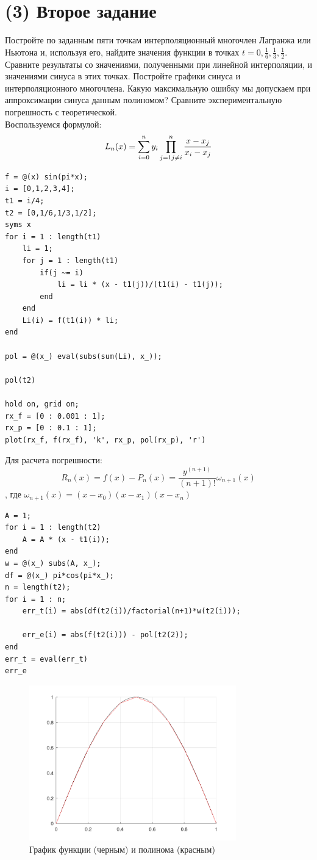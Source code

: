 \section{(3) Второе задание}
Постройте по заданным пяти точкам интерполяционный многочлен Лагранжа или Ньютона и, используя его, найдите значения функции в точках $t =0, \frac{1}{6}, \frac{1}{3}, \frac{1}{2}$. Сравните результаты со значениями, полученными при линейной интерполяции, и значениями синуса в этих точках. Постройте графики синуса и интерполяционного многочлена. Какую максимальную ошибку мы допускаем при аппроксимации синуса данным полиномом? Сравните экспериментальную погрешность с теоретической.\\[2mm]

Воспользуемся формулой:
\[
  L_{n}(x) = \sum_{i=0}^{n}y_{i}\prod_{j=1\\j \neq i}^{n}\frac{x-x_{j}}{x_{i}-x_{j}}
\]
\begin{lstlisting}
f = @(x) sin(pi*x);
i = [0,1,2,3,4];
t1 = i/4;
t2 = [0,1/6,1/3,1/2];
syms x
for i = 1 : length(t1)
	li = 1;
	for j = 1 : length(t1)
		if(j ~= i)
			li = li * (x - t1(j))/(t1(i) - t1(j));
		end
	end
	Li(i) = f(t1(i)) * li;
end

pol = @(x_) eval(subs(sum(Li), x_));

pol(t2)

hold on, grid on;
rx_f = [0 : 0.001 : 1];
rx_p = [0 : 0.1 : 1];
plot(rx_f, f(rx_f), 'k', rx_p, pol(rx_p), 'r')
\end{lstlisting}

Для расчета погрешности:
\[
  R_{n}(x) = f(x)-P_{n}(x) = \frac{y^{(n+1)}}{(n+1)!}\omega_{n+1}(x)
\]
, где $\omega_{n+1}(x) = (x-x_{0})(x-x_{1})(x-x_{n})$
\begin{lstlisting}
A = 1;
for i = 1 : length(t2)
	A = A * (x - t1(i));
end
w = @(x_) subs(A, x_);
df = @(x_) pi*cos(pi*x_);
n = length(t2);
for i = 1 : n;
	err_t(i) = abs(df(t2(i))/factorial(n+1)*w(t2(i)));

	err_e(i) = abs(f(t2(i))) - pol(t2(2));
end
err_t = eval(err_t)
err_e
\end{lstlisting}
\begin{figure}[h]
  \caption{График функции (черным) и полинома (красным)}
  \label{fig:plot_2}
  \centering
  \includegraphics[width=0.8\textwidth]{images/second_task_2.png}
\end{figure}

